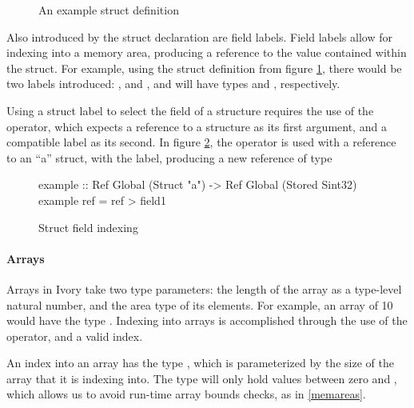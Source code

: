 \begin{figure}[h]
\begin{code}
\end{code}
\caption{An example struct definition}
\label{example-struct}
\end{figure}

Also introduced by the struct declaration are field labels.  Field labels allow
for indexing into a memory area, producing a reference to the value contained
within the struct.  For example, using the struct definition from figure
\ref{example-struct}, there would be two labels introduced: , and
, and will have types  and , respectively.

Using a struct label to select the field of a structure requires the use of the
\cd{(\mytilde>)} operator, which expects a reference to a structure as its first
argument, and a compatible label as its second.  In figure
\ref{example-struct-label}, the \cd{(\mytilde>)} operator is used with a reference to
an ``a'' struct, with the  label, producing a new reference of type

\begin{figure}[h]
\begin{code}
example :: Ref Global (Struct "a")
        -> Ref Global (Stored Sint32)
example ref = ref \mytilde> field1
\end{code}
\caption{Struct field indexing}
\label{example-struct-label}
\end{figure}

\paragraph{Arrays}
Arrays in Ivory take two type parameters: the length of the array as a
type-level natural number, and the area type of its elements.  For example, an
array of 10  would have the type .  Indexing into arrays is accomplished through the use of the \cd{(!)}
operator, and a valid index.

An index into an array has the type , which is parameterized by the size
of the array that it is indexing into.  The  type will only hold
values between zero and , which allows us to avoid run-time array bounds
checks, as in \ref{memareas}.

